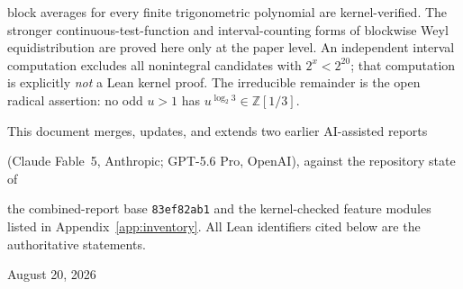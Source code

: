 \documentclass[11pt,oneside]{article}
\theoremstyle{definition}
\theoremstyle{remark}
\newcommand{\Z}{\mathbb Z}
\newcommand{\commit}[1]{\texttt{#1}}
\begin{document}
\begin{titlepage}
\begin{minipage}{0.88\textwidth}
block averages for every finite trigonometric polynomial are kernel-verified.  The stronger
continuous-test-function and interval-counting forms of blockwise Weyl equidistribution are
proved here only at the paper level.  An independent interval computation excludes all nonintegral candidates with
$2^x<2^{20}$; that computation is explicitly \emph{not} a Lean kernel proof.  The irreducible
remainder is the open radical assertion: no odd $u>1$ has
$u^{\log_2 3}\in\Z[1/3]$.
\end{minipage}
\vfill
{\normalsize This document merges, updates, and extends two earlier AI-assisted reports\par
(Claude Fable~5, Anthropic; GPT-5.6 Pro, OpenAI), against the repository state of\par
the combined-report base \commit{83ef82ab1} and the kernel-checked feature modules listed in
Appendix~\ref{app:inventory}.  All Lean identifiers cited below are the authoritative
statements.\par}
\vspace{0.6cm}
{\large August 20, 2026\par}
\end{titlepage}
\end{document}
